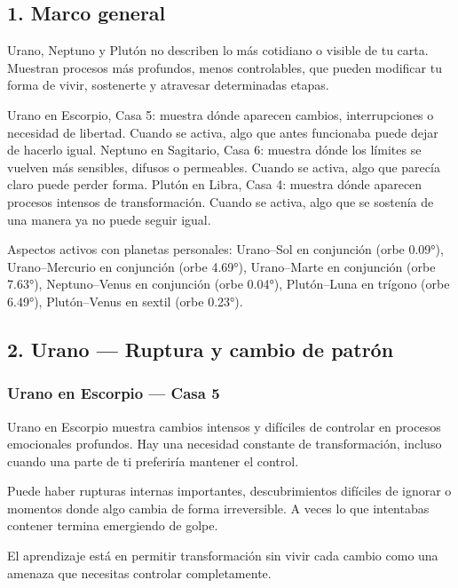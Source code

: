 \documentclass[11pt,a4paper]{article}
\begin{document}
\subsection{1. Marco general}

Urano, Neptuno y Plutón no describen lo más cotidiano o visible de tu carta. Muestran procesos más profundos, menos controlables, que pueden modificar tu forma de vivir, sostenerte y atravesar determinadas etapas.

Urano en Escorpio, Casa 5: muestra dónde aparecen cambios, interrupciones o necesidad de libertad. Cuando se activa, algo que antes funcionaba puede dejar de hacerlo igual.
Neptuno en Sagitario, Casa 6: muestra dónde los límites se vuelven más sensibles, difusos o permeables. Cuando se activa, algo que parecía claro puede perder forma.
Plutón en Libra, Casa 4: muestra dónde aparecen procesos intensos de transformación. Cuando se activa, algo que se sostenía de una manera ya no puede seguir igual.

Aspectos activos con planetas personales: Urano–Sol en conjunción (orbe 0.09°), Urano–Mercurio en conjunción (orbe 4.69°), Urano–Marte en conjunción (orbe 7.63°), Neptuno–Venus en conjunción (orbe 0.04°), Plutón–Luna en trígono (orbe 6.49°), Plutón–Venus en sextil (orbe 0.23°).

\vspace{0.8cm}


\subsection{2. Urano — Ruptura y cambio de patrón}

\subsubsection*{Urano en Escorpio — Casa 5}

Urano en Escorpio muestra cambios intensos y difíciles de controlar en procesos emocionales profundos. Hay una necesidad constante de transformación, incluso cuando una parte de ti preferiría mantener el control.

Puede haber rupturas internas importantes, descubrimientos difíciles de ignorar o momentos donde algo cambia de forma irreversible. A veces lo que intentabas contener termina emergiendo de golpe.

El aprendizaje está en permitir transformación sin vivir cada cambio como una amenaza que necesitas controlar completamente.
\end{document}
